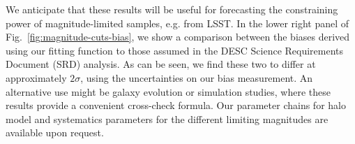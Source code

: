\documentclass[a4paper,11pt]{article}
\begin{document}
    We anticipate that these results will be useful for forecasting the constraining power of magnitude-limited samples, e.g. from LSST. In the lower right panel of Fig.~\ref{fig:magnitude-cuts-bias}, we show a comparison between the biases derived using our fitting function to those assumed in the DESC Science Requirements Document (SRD) analysis. As can be seen, we find these two to differ at approximately $2 \sigma$, using the uncertainties on our bias measurement. An alternative use might be galaxy evolution or simulation studies, where these results provide a convenient cross-check formula. Our parameter chains for halo model and systematics parameters for the different limiting magnitudes are available upon request. 
\end{document}
